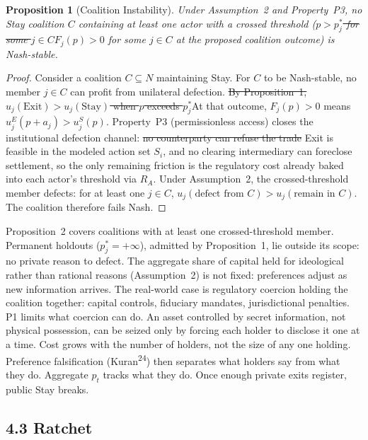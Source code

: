 \documentclass[12pt]{article}
\newtheorem{proposition}{Proposition}
\theoremstyle{definition}
\theoremstyle{remark}
\providecommand{\DIFaddtex}[1]{{\color{AddedText}#1}}
\providecommand{\DIFdeltex}[1]{{\color{DeletedText}\sout{#1}}}
\providecommand{\DIFaddbegin}{}
\providecommand{\DIFaddend}{}
\providecommand{\DIFdelbegin}{}
\providecommand{\DIFdelend}{}
\providecommand{\DIFadd}[1]{\texorpdfstring{\DIFaddtex{#1}}{#1}} %
\providecommand{\DIFdel}[1]{\texorpdfstring{\DIFdeltex{#1}}{}} %
\begin{document}
\begin{proposition}[Coalition Instability]
Under Assumption~2 and Property~P3, no Stay coalition $C$
containing at least one actor with a crossed threshold
(\DIFdelbegin \DIFdel{$p > p_j^*$ for some $j \in C$}\DIFdelend \DIFaddbegin \DIFadd{$F_j(p)>0$ for some $j\in C$ at the proposed coalition outcome}\DIFaddend ) is Nash-stable.
\end{proposition}

\begin{proof}
Consider a coalition $C \subseteq N$ maintaining Stay. For $C$ to be Nash-stable, no member $j \in C$ can profit from unilateral defection. \DIFdelbegin \DIFdel{By Proposition~1, $u_j(\text{Exit}) > u_j(\text{Stay})$ when $p$ exceeds $p_j^*$}\DIFdelend \DIFaddbegin \DIFadd{At that outcome, $F_j(p)>0$ means $u_j^E(p+a_j)>u_j^S(p)$}\DIFaddend . Property~P3 (permissionless access) closes the institutional defection channel: \DIFdelbegin \DIFdel{no counterparty can refuse the trade }\DIFdelend \DIFaddbegin \DIFadd{Exit is feasible in the modeled action set $S_i$, }\DIFaddend and no clearing intermediary can foreclose settlement, so the only remaining friction is the regulatory cost already baked into each actor's threshold via $R_A$. Under Assumption~2, the crossed-threshold member defects: for at least one $j \in C$, $u_j(\text{defect from } C) > u_j(\text{remain in } C)$. The coalition therefore fails Nash.
\end{proof}

Proposition~2 covers coalitions with at least one crossed-threshold member. Permanent holdouts ($p_j^* = +\infty$), admitted by Proposition~1, lie outside its scope: no private reason to defect. The aggregate share of capital held for ideological rather than rational reasons (Assumption~2) is not fixed: preferences adjust as new information arrives. The real-world case is regulatory coercion holding the coalition together: capital controls, fiduciary mandates, jurisdictional penalties. P1 limits what coercion can do. An asset controlled by secret information, not physical possession, can be seized only by forcing each holder to disclose it one at a time. Cost grows with the number of holders, not the size of any one holding. Preference falsification (Kuran\textsuperscript{24}) then separates what holders say from what they do. Aggregate $p_t$ tracks what they do. Once enough private exits register, public Stay breaks.

\subsection{4.3 Ratchet}
\end{document}

